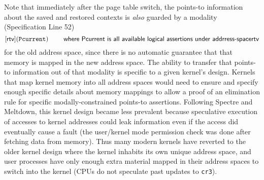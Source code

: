 Note that immediately after the page table switch, the points-to information about the saved and restored contexts is \emph{also} guarded by a modality (Specification Line 52)
\[ [\textsf{rtv}](\texttt{Pcurrent}) \qquad \textsf{ where Pcurrent is all available logical assertions under addrress-space} \textsf{rtv}\]
for the old address space, since there is no automatic guarantee that that memory is mapped in the new address space.  The ability to transfer that points-to information out of that modality is specific to a given kernel's design. Kernels that map kernel memory into all address spaces would need to ensure and specify enough specific details about memory mappings to allow a proof of an elimination rule for specific modally-constrained points-to assertions.
Following Spectre and Meltdown, this kernel design became less prevalent because speculative execution of accesses to kernel addresses could leak information even if the access did eventually cause a fault (the user/kernel mode permission check was done after fetching data from memory). Thus many modern kernels have reverted to the older kernel design where the kernel inhabits its own unique address space, and user processes have only enough extra material mapped in their address spaces to switch into the kernel (CPUs do not speculate past updates to \texttt{cr3}).

